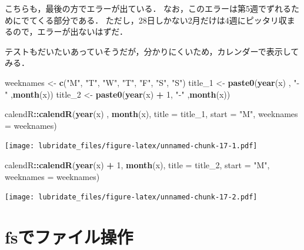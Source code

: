 \documentclass[
]{article}
\newenvironment{Shaded}{\begin{snugshade}}{\end{snugshade}}
\newcommand{\AttributeTok}[1]{\textcolor[rgb]{0.13,0.29,0.53}{#1}}
\newcommand{\DecValTok}[1]{\textcolor[rgb]{0.00,0.00,0.81}{#1}}
\newcommand{\FunctionTok}[1]{\textcolor[rgb]{0.13,0.29,0.53}{\textbf{#1}}}
\newcommand{\NormalTok}[1]{#1}
\newcommand{\OtherTok}[1]{\textcolor[rgb]{0.56,0.35,0.01}{#1}}
\newcommand{\SpecialCharTok}[1]{\textcolor[rgb]{0.81,0.36,0.00}{\textbf{#1}}}
\newcommand{\StringTok}[1]{\textcolor[rgb]{0.31,0.60,0.02}{#1}}
\begin{document}
こちらも，最後の方でエラーが出ている．
なお，このエラーは第5週でずれるためにでてくる部分である．
ただし，28日しかない2月だけは4週にピッタリ収まるので，エラーが出ないはずだ．

テストもだいたいあっていそうだが，分かりにくいため，カレンダーで表示してみる．

\begin{Shaded}
\begin{Highlighting}[]
\NormalTok{weeknames }\OtherTok{\textless{}{-}}  \FunctionTok{c}\NormalTok{(}\StringTok{"M"}\NormalTok{, }\StringTok{"T"}\NormalTok{, }\StringTok{"W"}\NormalTok{, }\StringTok{"T"}\NormalTok{, }\StringTok{"F"}\NormalTok{, }\StringTok{"S"}\NormalTok{, }\StringTok{"S"}\NormalTok{)}
\NormalTok{title\_1 }\OtherTok{\textless{}{-}} \FunctionTok{paste0}\NormalTok{(}\FunctionTok{year}\NormalTok{(x)    , }\StringTok{"{-}"}\NormalTok{ ,}\FunctionTok{month}\NormalTok{(x))}
\NormalTok{title\_2 }\OtherTok{\textless{}{-}} \FunctionTok{paste0}\NormalTok{(}\FunctionTok{year}\NormalTok{(x) }\SpecialCharTok{+} \DecValTok{1}\NormalTok{, }\StringTok{"{-}"}\NormalTok{ ,}\FunctionTok{month}\NormalTok{(x))}

\NormalTok{calendR}\SpecialCharTok{::}\FunctionTok{calendR}\NormalTok{(}\FunctionTok{year}\NormalTok{(x)    , }\FunctionTok{month}\NormalTok{(x), }\AttributeTok{title =}\NormalTok{ title\_1, }\AttributeTok{start =} \StringTok{"M"}\NormalTok{, }\AttributeTok{weeknames =}\NormalTok{ weeknames)}
\end{Highlighting}
\end{Shaded}

\texttt{[image: lubridate\_files/figure-latex/unnamed-chunk-17-1.pdf]}

\begin{Shaded}
\begin{Highlighting}[]
\NormalTok{calendR}\SpecialCharTok{::}\FunctionTok{calendR}\NormalTok{(}\FunctionTok{year}\NormalTok{(x) }\SpecialCharTok{+} \DecValTok{1}\NormalTok{, }\FunctionTok{month}\NormalTok{(x), }\AttributeTok{title =}\NormalTok{ title\_2, }\AttributeTok{start =} \StringTok{"M"}\NormalTok{, }\AttributeTok{weeknames =}\NormalTok{ weeknames)}
\end{Highlighting}
\end{Shaded}

\texttt{[image: lubridate\_files/figure-latex/unnamed-chunk-17-2.pdf]}

\hypertarget{fs}{%
\section{fsでファイル操作}\label{fs}}
\end{document}
